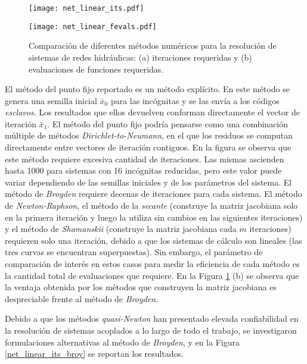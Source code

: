 \begin{figure}[ht]
	\begin{minipage}{0.5\linewidth}
		\centering
		\texttt{[image: net\_linear\_its.pdf]}
	\end{minipage}
	\begin{minipage}{0.5\linewidth}
		\centering
		\texttt{[image: net\_linear\_fevals.pdf]}
	\end{minipage}
	\caption[Comparación de diferentes métodos numéricos para la resolución de sistemas de redes hidráulicas]
  {Comparación de diferentes métodos numéricos para la resolución de sistemas de redes hidráulicas:
  (a) iteraciones requeridas y (b) evaluaciones de funciones requeridas.}
  \label{net_linear}
\end{figure}

El método del punto fijo reportado es un método explícito.
En este método se genera una semilla inicial $\bar{x}_0$ para las incógnitas y se las envía a los códigos \textit{esclavos}.
Los resultados que ellos devuelven conforman directamente el vector de iteración $\bar{x}_1$.
El método del punto fijo podría pensarse como una combinación múltiple de métodos \textit{Dirichlet-to-Neumann},
en el que los residuos se computan directamente entre vectores de iteración contiguos.
En la figura se observa que este método requiere excesiva cantidad de iteraciones.
Las mismas ascienden hasta 1000 para sistemas con 16 incógnitas reducidas,
pero este valor puede variar dependiendo de las semillas iniciales y de los parámetros del sistema.
El método de \textit{Broyden} requiere decenas de iteraciones para cada sistema.
El método de \textit{Newton-Raphson}, el método de la \textit{secante} (construye la matriz jacobiana solo en la primera iteración y luego la utiliza sin cambios en las siguientes iteraciones)
y el método de \textit{Shamanskii} (construye la matriz jacobiana cada $m$ iteraciones)
requieren solo una iteración, debido a que los sistemas de cálculo son lineales
(las tres curvas se encuentran superpuestas).
Sin embargo, el parámetro de comparación de interés en estos casos para medir la eficiencia de cada método es la cantidad total de evaluaciones que requiere.
En la Figura \ref{net_linear} (b) se observa que la ventaja obtenida por los métodos que construyen la matriz jacobiana es despreciable frente al método de \textit{Broyden}.

Debido a que los métodos \textit{quasi-Newton} han presentado elevada confiabilidad en la resolución de sistemas acoplados a lo largo de todo el trabajo,
se investigaron formulaciones alternativas al método de \textit{Broyden},
y en la Figura \ref{net_linear_its_broy} se reportan los resultados.

